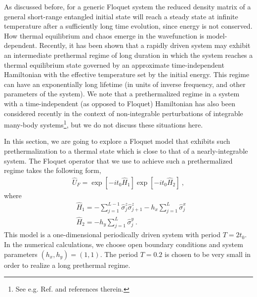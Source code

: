 \documentclass[aps,prb,preprint,onecolumn,amsmath,amssymb,superscriptaddress,eqsecnum,floatfix,scrartcl]{revtex4-1}
\begin{document}
As  discussed before, for a generic Floquet system
the reduced  density matrix of a general  
short-range entangled  initial state 
 will reach a steady state 
at  infinite temperature
after a sufficiently long time evolution, since energy is not conserved.\cite{Kim_Huse_2014,DAlessio2014,PONTE2015,DALESSIO2013}
How thermal equilibrium and chaos emerge
in the wavefunction  is model-dependent. Recently, it has been shown that 
 a rapidly driven system 
may exhibit 
an
 intermediate prethermal regime of long duration
 in which the system reaches a thermal equilibrium state governed by an approximate time-independent Hamiltonian with the effective temperature set by the initial energy.\cite{Mori2016,Abanin2015,Abanin_2017,Else_2017,Machado2017} This regime can have an
exponentially long lifetime (in units of inverse frequency, and other parameters of the system).
We   note that a prethermalized regime in a system with  a time-independent (as opposed to Floquet)  Hamiltonian
has also been considered recently in the context of non-integrable perturbations of integrable many-body systems\footnote{See e.g. 
Ref.  and references therein.}, but we do not discuss these situations here.

In this section, we are going to explore a Floquet model 
that exhibits
such prethermalization to a thermal state 
which is close to  that of a nearly-integrable system.
 The Floquet operator that we use to achieve such
a prethermalized regime takes the following form,
\begin{align}
\hat{U}_F=\exp[-i t_0 \hat{H}_1]\exp\left[-it_0\hat H_2\right] ~,
\label{flo_op_pre}
\end{align}
where
\begin{align}
&\hat{H}_1=-\sum_{j=1}^{L-1}\hat\sigma_j^z\hat\sigma_{j+1}^z-h_x\sum_{j=1}^L\hat\sigma_j^x \nonumber\\
&\hat{H}_2=-h_y\sum_{j=1}^{L}\hat\sigma_j^y ~.
\label{floq_pre}
\end{align}
This model is a one-dimensional periodically driven system with period $T=2t_0$. In the numerical calculations, we choose open
boundary conditions and system parameters $(h_x,h_y)=(1, 1)$.
 The period $T=0.2$ is chosen to be very small
in order to realize a long prethermal regime.
\end{document}
